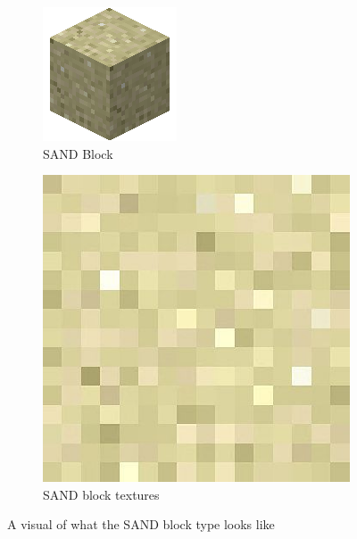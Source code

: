 \documentclass[12pt, titlepage]{article}
\begin{document}
\begin{figure}[!tbp]
  \begin{subfigure}[b]{0.3\textwidth}
    \includegraphics[width=\textwidth]{SandBlock.png}
    \caption{SAND Block}
    \label{fig:f1}
  \end{subfigure}
  \hfill
  \begin{subfigure}[b]{0.3\textwidth}
    \includegraphics[width=\textwidth]{SandTexture.jpg}
    \caption{SAND block textures}
    \label{fig:f2}
  \end{subfigure}
  \caption{A visual of what the SAND block type looks like}
\end{figure}
\end{document}
